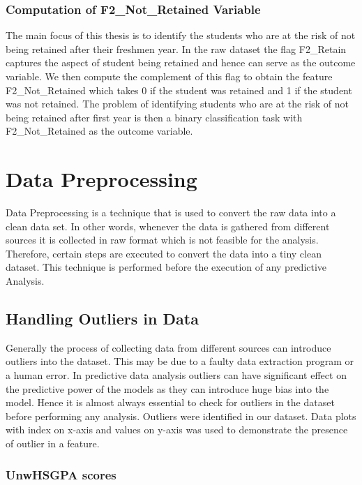 \documentclass[11pt,openright]{report}
\begin{document}
\subsubsection {Computation of F2\_Not\_Retained Variable}
The main focus of this thesis is to identify the students who are at the risk of not being retained after their freshmen year. In the raw dataset the flag F2\_Retain captures the aspect of student being retained and hence can serve as the outcome variable. We then compute the complement of this flag to obtain the feature F2\_Not\_Retained which takes 0 if the student was retained and 1 if the student was not retained. The problem of identifying students who are at the risk of not being retained after first year is then a binary classification task with F2\_Not\_Retained as the outcome variable.

\section {Data Preprocessing}
Data Preprocessing is a technique that is used to convert the raw data into a clean data set. In other words, whenever the data is gathered from different sources it is collected in raw format which is not feasible for the analysis.
Therefore, certain steps are executed to convert the data into a tiny clean dataset. This technique is performed before the execution of any predictive Analysis. 


\subsection {Handling Outliers in Data}

Generally the process of collecting data from different sources can introduce outliers into the dataset. This may be due to a faulty data extraction program or a human error. In predictive data analysis outliers can have significant effect on the predictive power of the models as they can introduce huge bias into the model. Hence it is almost always essential to check for outliers in the dataset before performing any analysis. Outliers were identified in our dataset. Data plots with index on x-axis and values on y-axis was used to demonstrate the presence of outlier in a feature.


\subsubsection{UnwHSGPA scores}
\end{document}
